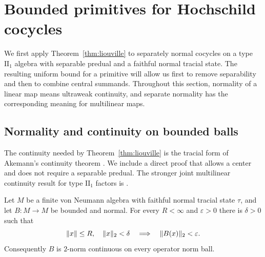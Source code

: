 \section{Bounded primitives for Hochschild cocycles}\label{sec:cohomology}

We first apply Theorem~\ref{thm:liouville} to separately normal
cocycles on a type $\mathrm{II}_1$ algebra with separable predual and a
faithful normal tracial state.  The resulting uniform bound for a
primitive will allow us first to remove separability and then to
combine central summands.  Throughout this
section, normality of a linear map means ultraweak continuity, and
separate normality has the corresponding meaning for multilinear maps.

\subsection{Normality and continuity on bounded balls}

The continuity needed by Theorem~\ref{thm:liouville} is the tracial
form of Akemann's continuity theorem
\cite[Corollary~III.10]{Akemann1967}. We include a direct proof that
allows a center and does not require a separable predual.
The stronger joint multilinear continuity result for type
$\mathrm{II}_1$ factors is \cite[Theorem~4.4]{CPSS2003}.

\begin{lemma}\label{lem:normal-two-continuity}
Let $M$ be a finite von Neumann algebra with faithful normal tracial
state $\tau$, and let $B:M\to M$ be bounded and normal.  For every
$R<\infty$ and $\varepsilon>0$ there is $\delta>0$ such that
\[
 \lVert x\rVert\le R,\quad \lVert x\rVert_2<\delta
 \quad\Longrightarrow\quad \lVert B(x)\rVert_2<\varepsilon.
\]
Consequently $B$ is $2$-norm continuous on every operator norm ball.
\end{lemma}

